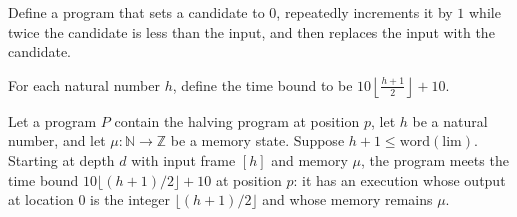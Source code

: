 \begin{definition}
\label{Light.halfBody}
\leanok
{}
Define a program that sets a candidate to $0$, repeatedly increments it by $1$ while
twice the candidate is less than the input, and then replaces the input with the
candidate.
\end{definition}

\begin{definition}
\label{Light.halfTime}
\leanok
For each natural number $h$, define the time bound to be
$10\left\lfloor\frac{h+1}{2}\right\rfloor+10$.
\end{definition}

\begin{theorem}
\label{Light.half_meets}
\leanok
{}
Let a program $P$ contain the halving program at position $p$, let $h$ be a natural
number, and let $\mu:\mathbb N\to\mathbb Z$ be a memory state. Suppose
$h+1\leq\mathrm{word}(\mathrm{lim})$. Starting at depth $d$ with input frame $[h]$ and
memory $\mu$, the program meets the time bound $10\lfloor(h+1)/2\rfloor+10$ at position
$p$: it has an execution whose output at location $0$ is the integer
$\lfloor(h+1)/2\rfloor$ and whose memory remains $\mu$.
\end{theorem}
